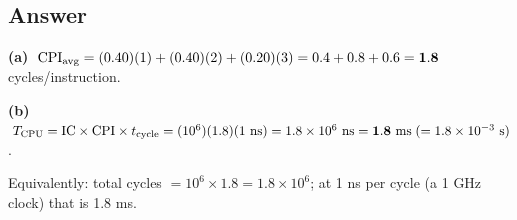 \subsection*{Answer}

\begin{answerbox}
\textbf{(a)} $\;\mathrm{CPI}_{\text{avg}} = (0.40)(1) + (0.40)(2) + (0.20)(3)
  = 0.4 + 0.8 + 0.6 = \mathbf{1.8}$ cycles/instruction.

\medskip
\textbf{(b)} $\;T_{\mathrm{CPU}} = \mathrm{IC} \times \mathrm{CPI} \times t_{\mathrm{cycle}}
  = (10^{6})(1.8)(1\ \text{ns})
  = 1.8\times10^{6}\ \text{ns} = \mathbf{1.8\ \text{ms}}
  \;(= 1.8\times10^{-3}\ \text{s})$.

\medskip
{\small Equivalently: total cycles $= 10^{6} \times 1.8 = 1.8\times10^{6}$; at
1 ns per cycle (a 1 GHz clock) that is 1.8 ms.}
\end{answerbox}


